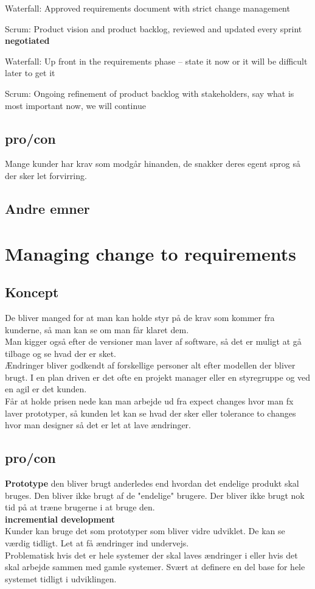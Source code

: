 \documentclass[11pt,a4paper]{article}
\begin{document}
Waterfall: Approved requirements document with strict change management

Scrum: Product vision and product backlog, reviewed and updated every sprint\\
\textbf{negotiated}

Waterfall: Up front in the requirements phase – state it now or it will be difficult later to get it

Scrum: Ongoing refinement of product backlog with stakeholders, say what is most important now, we will continue
\subsection{pro/con}
Mange kunder har krav som modgår hinanden, de snakker deres egent sprog så der sker let forvirring.
\subsection{Andre emner}
\newpage
\section{Managing change to requirements}
\subsection{Koncept}
De bliver manged for at man kan holde styr på de krav som kommer fra kunderne, så man kan se om man får klaret dem.\\
Man kigger også efter de versioner man laver af software, så det er muligt at gå tilbage og se hvad der er sket.\\
Ændringer bliver godkendt af forskellige personer alt efter modellen der bliver brugt. I en plan driven er det ofte en projekt manager eller en styregruppe og ved en agil er det kunden.\\
Får at holde prisen nede kan man arbejde ud fra expect changes hvor man fx laver prototyper, så kunden let kan se hvad der sker eller tolerance to changes hvor man designer så det er let at lave ændringer.
\subsection{pro/con}
\textbf{Prototype} den bliver brugt anderledes end hvordan det endelige produkt skal bruges. Den bliver ikke brugt af de "endelige" brugere. Der bliver ikke brugt nok tid på at træne brugerne i at bruge den.\\
\textbf{incremential development}\\
Kunder kan bruge det som prototyper som bliver vidre udviklet. De kan se værdig tidligt. Let at få ændringer ind undervejs.\\
Problematisk hvis det er hele systemer der skal laves ændringer i eller hvis det skal arbejde sammen med gamle systemer. Svært at definere en del base for hele systemet tidligt i udviklingen. 
\end{document}
